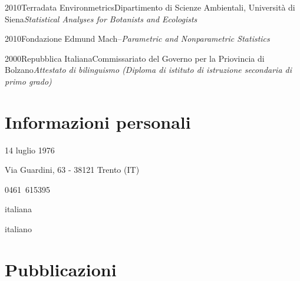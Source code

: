 \documentclass{curriculum}
\begin{document}
    \begin{entrylist}
    \entry
        {2010}{Terradata Environmetrics}{Dipartimento di Scienze Ambientali, Università di Siena}{\emph{Statistical Analyses for Botanists and Ecologists}}
    \end{entrylist}
    
    \begin{entrylist}
    \entry
        {2010}{Fondazione Edmund Mach}{--}{\emph{Parametric and Nonparametric Statistics}}
    \end{entrylist}
    
    \begin{entrylist}
    \entry
        {2000}{Repubblica Italiana}{Commissariato del Governo per la Priovincia di Bolzano}{\emph{Attestato di bilinguismo (Diploma di istituto di istruzione secondaria di primo grado)}}
    \end{entrylist}
    
    \section{Informazioni personali}
    \begin{description}[style= unboxed, leftmargin= 6 pt, topsep= -3 pt, parsep= 3 pt, itemsep= 2pt]
        \item[Data di nascita:] 14 luglio 1976
        \item[Indirizzo:] Via Guardini, 63 - 38121 Trento (IT)
        \item[Telefono:] 0461~615395
        \item[Nazionalità:] italiana
        \item[Madrelingua:] italiano
    \end{description}
    
    
    \section{Pubblicazioni}
    \vspace{-0.75cm}
    \begin{refsection}
        \nocite{*}
        \newrefcontext[sorting=ydnt]
        \printbibliography[type=article, title={Riviste peer-review}, heading=subbibliography, notkeyword=divulgative]
    \end{refsection}
    
    \begin{refsection}
        \nocite{*}
        \newrefcontext[sorting=ydnt]
        \printbibliography[type=incollection, notkeyword=report, title={Capitoli di libro}, heading=subbibliography]
    \end{refsection}
        
\end{document}
